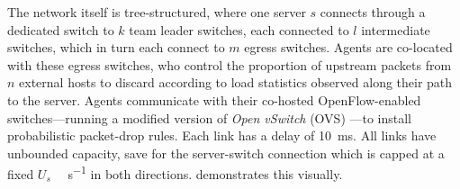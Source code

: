 \documentclass[conference, letterpaper, 10pt, times]{IEEEtran}
\begin{document}
The network itself is tree-structured, where one server $s$ connects through a dedicated switch to $k$ team leader switches, each connected to $l$ intermediate switches, which in turn each connect to $m$ egress switches.
Agents are co-located with these egress switches, who control the proportion of upstream packets from $n$ external hosts to discard according to load statistics observed along their path to the server.
Agents communicate with their co-hosted OpenFlow-enabled switches---running a modified version of \emph{Open vSwitch} (OVS) \cite{open-vswitch}---to install probabilistic packet-drop rules.
Each link has a delay of \SI{10}{\milli\second}.
All links have unbounded capacity, save for the server-switch connection which is capped at a fixed $U_s$ \si{\mega\bit\per\second} in both directions.
 demonstrates this visually.
\end{document}
